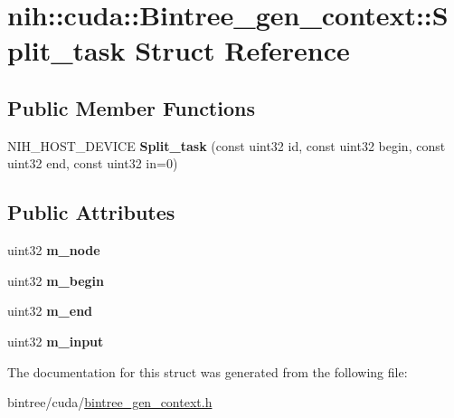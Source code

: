 \hypertarget{structnih_1_1cuda_1_1_bintree__gen__context_1_1_split__task}{
\section{nih\-:\-:cuda\-:\-:\-Bintree\-\_\-gen\-\_\-context\-:\-:\-Split\-\_\-task \-Struct \-Reference}
\label{structnih_1_1cuda_1_1_bintree__gen__context_1_1_split__task}
}
\subsection*{\-Public \-Member \-Functions}
\begin{DoxyCompactItemize}
\item 
\hypertarget{structnih_1_1cuda_1_1_bintree__gen__context_1_1_split__task_ae1c560c306c8158bbb2e371354417034}{
\-N\-I\-H\-\_\-\-H\-O\-S\-T\-\_\-\-D\-E\-V\-I\-C\-E {\bfseries \-Split\-\_\-task} (const uint32 id, const uint32 begin, const uint32 end, const uint32 in=0)}
\label{structnih_1_1cuda_1_1_bintree__gen__context_1_1_split__task_ae1c560c306c8158bbb2e371354417034}

\end{DoxyCompactItemize}
\subsection*{\-Public \-Attributes}
\begin{DoxyCompactItemize}
\item 
\hypertarget{structnih_1_1cuda_1_1_bintree__gen__context_1_1_split__task_a2357bac8f475edfffc62571f31666d15}{
uint32 {\bfseries m\-\_\-node}}
\label{structnih_1_1cuda_1_1_bintree__gen__context_1_1_split__task_a2357bac8f475edfffc62571f31666d15}

\item 
\hypertarget{structnih_1_1cuda_1_1_bintree__gen__context_1_1_split__task_abfdacc18d9e093ef6ad8f098d067ffbd}{
uint32 {\bfseries m\-\_\-begin}}
\label{structnih_1_1cuda_1_1_bintree__gen__context_1_1_split__task_abfdacc18d9e093ef6ad8f098d067ffbd}

\item 
\hypertarget{structnih_1_1cuda_1_1_bintree__gen__context_1_1_split__task_a6c2372d43f79d1567c1a4f8150020f3e}{
uint32 {\bfseries m\-\_\-end}}
\label{structnih_1_1cuda_1_1_bintree__gen__context_1_1_split__task_a6c2372d43f79d1567c1a4f8150020f3e}

\item 
\hypertarget{structnih_1_1cuda_1_1_bintree__gen__context_1_1_split__task_a0bff2664bfb2b7cc00aafb9bea7f4a18}{
uint32 {\bfseries m\-\_\-input}}
\label{structnih_1_1cuda_1_1_bintree__gen__context_1_1_split__task_a0bff2664bfb2b7cc00aafb9bea7f4a18}

\end{DoxyCompactItemize}


\-The documentation for this struct was generated from the following file\-:\begin{DoxyCompactItemize}
\item 
bintree/cuda/\hyperlink{bintree__gen__context_8h}{bintree\-\_\-gen\-\_\-context.\-h}\end{DoxyCompactItemize}
